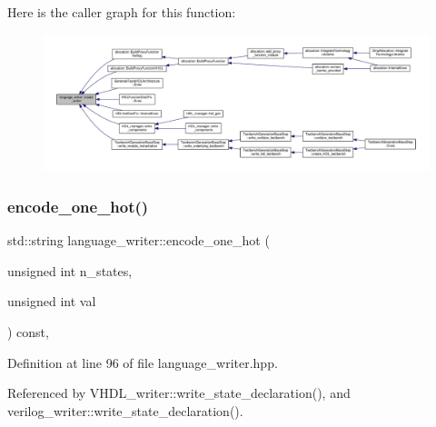 Here is the caller graph for this function\+:
\nopagebreak
\begin{figure}[H]
\begin{center}
\leavevmode
\includegraphics[width=350pt]{d6/d67/classlanguage__writer_ae0ae8fbdc6d0a7e8a22b4344672c45ef_icgraph}
\end{center}
\end{figure}
\mbox{\label{classlanguage__writer_a076458c3656ec8f405db0dbf55889f69}} 
\subsubsection{\texorpdfstring{encode\+\_\+one\+\_\+hot()}{encode\_one\_hot()}}
{\footnotesize\ttfamily std\+::string language\+\_\+writer\+::encode\+\_\+one\+\_\+hot (\begin{DoxyParamCaption}\item[{unsigned int}]{n\+\_\+states,  }\item[{unsigned int}]{val }\end{DoxyParamCaption}) const\hspace{0.3cm}{\ttfamily [inline]}, {\ttfamily [protected]}}



Definition at line 96 of file language\+\_\+writer.\+hpp.



Referenced by V\+H\+D\+L\+\_\+writer\+::write\+\_\+state\+\_\+declaration(), and verilog\+\_\+writer\+::write\+\_\+state\+\_\+declaration().


